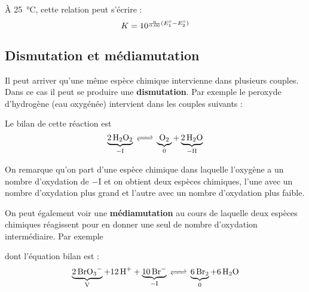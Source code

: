 \documentclass{cours}
\begin{document}
À \SI{25}{\celsius}, cette relation peut s'écrire :
\begin{equation}
\large
  K = 10^{\frac{n}{0.06}(E^\circ_1-E^\circ_2)}
\end{equation}

\subsection{Dismutation et médiamutation}%
\label{sub:dismutation_et_mediamutation}
Il peut arriver qu'une même espèce chimique intervienne dans plusieurs couples. Dans ce cas il peut se produire une \textbf{dismutation}. Par exemple le peroxyde d'hydrogène (eau oxygénée) intervient dans les couples suivants :

\begin{center}
\end{center}

Le bilan de cette réaction est 
\begin{equation}
  \underbrace{\ce{2H2O2}}_{-\text{I}} \ce{<=>} \underbrace{\ce{O2}}_{0} + \underbrace{\ce{2H2O}}_{-\text{II}}
\end{equation}

On remarque qu'on part d'une espèce chimique dans laquelle l'oxygène a un nombre d'oxydation de $-\text{I}$ et on obtient deux espèces chimiques, l'une avec un nombre d'oxydation plus grand et l'autre avec un nombre d'oxydation plus faible. 

On peut également voir une \textbf{médiamutation} au cours de laquelle deux espèces chimiques réagissent pour en donner une seul de nombre d'oxydation intermédiaire. Par exemple  

\begin{center}
\end{center}
dont l'équation bilan est :
\begin{equation}
  \underbrace{\ce{2BrO3-}}_{\text{V}} + \ce{12H+} + \underbrace{\ce{10Br-}}_{-\text{I}} \ce{<=>} \underbrace{\ce{6Br2}}_{0} + \ce{6H2O}
\end{equation}
\end{document}
